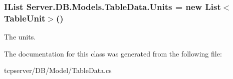 \hypertarget{classServer_1_1DB_1_1Models_1_1TableData_a5357a9d0799a986087e94458897ce6f9}{}
\subsubsection[{Units}]{\setlength{\rightskip}{0pt plus 5cm}I\+List Server.\+D\+B.\+Models.\+Table\+Data.\+Units = new List$<${\bf Table\+Unit}$>$()}\label{classServer_1_1DB_1_1Models_1_1TableData_a5357a9d0799a986087e94458897ce6f9}


The units. 



The documentation for this class was generated from the following file\+:\begin{DoxyCompactItemize}
\item 
tcpserver/\+D\+B/\+Model/Table\+Data.\+cs\end{DoxyCompactItemize}
